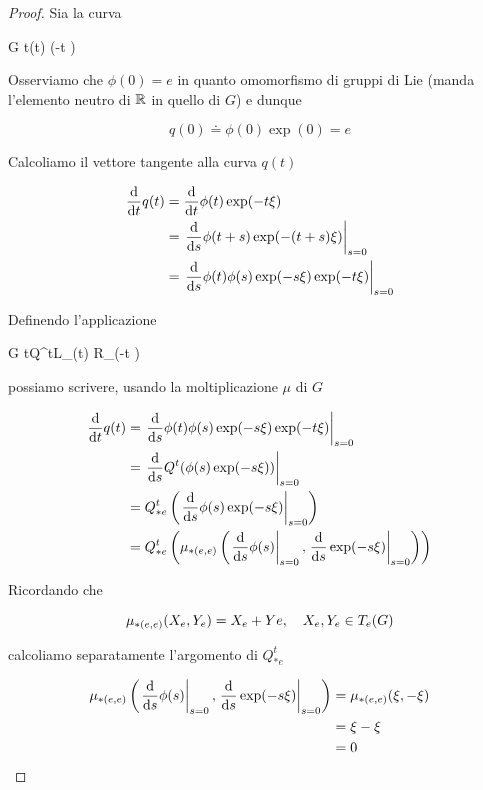 \begin{proof}
	Sia la curva
	
		{\R}{G}%
		{t}{\phi(t) \exp(-t \xi)}
		
	Osserviamo che $ \phi(0) = e $ in quanto omomorfismo di gruppi di Lie (manda l'elemento neutro di $ \mathbb{R} $ in quello di $ G $) e dunque
	
	\begin{equation}
		q(0) \doteq \phi(0) \exp(0) = e
	\end{equation}
	
	Calcoliamo il vettore tangente alla curva $ q(t) $
	
	\begin{align}
		\begin{split}
			\dv{t} q(t) &= \dv{t} \phi(t) \exp(-t \xi)\\
			&= \eval{ \dv{s} \phi(t+s) \exp(- (t+s) \xi) }_{s=0}\\
			&= \eval{ \dv{s} \phi(t) \phi(s) \exp(-s \xi) \exp(-t \xi) }_{s=0}
		\end{split}
	\end{align}

	Definendo l'applicazione
	
		{\R}{G}%
		{t}{Q^{t}L_{\phi(t)} \circ R_{\exp(-t \xi)}}
		
	possiamo scrivere, usando la moltiplicazione $ \mu $ di $ G $
	
	\begin{align}
		\begin{split}
			\dv{t} q(t) &= \eval{ \dv{s} \phi(t) \phi(s) \exp(-s \xi) \exp(-t \xi) }_{s=0}\\
			&= \eval{ \dv{s} Q^{t} (\phi(s) \exp(-s \xi)) }_{s=0}\\
			&= Q^{t}_{*e} \left( \eval{ \dv{s} \phi(s) \exp(-s \xi) }_{s=0} \right)\\
			&= Q^{t}_{*e} \left( \mu_{*(e,e)} \left( \eval{ \dv{s} \phi(s) }_{s=0}, \eval{ \dv{s} \exp(-s \xi) }_{s=0} \right) \right)
		\end{split}
	\end{align}

	Ricordando che
	
	\begin{equation}
		\mu_{*(e,e)} (X_{e},Y_{e}) = X_{e} + Y {e} \qcomma X_{e},Y_{e} \in T_{e}(G)
	\end{equation}

	calcoliamo separatamente l'argomento di $ Q^{t}_{*e} $
	
	\begin{align}
		\begin{split}
			\mu_{*(e,e)} \left( \eval{ \dv{s} \phi(s) }_{s=0}, \eval{ \dv{s} \exp(-s \xi) }_{s=0} \right) &= \mu_{*(e,e)} (\xi, -\xi)\\
			&= \xi - \xi\\
			&= 0
		\end{split}
	\end{align}


\end{proof}
